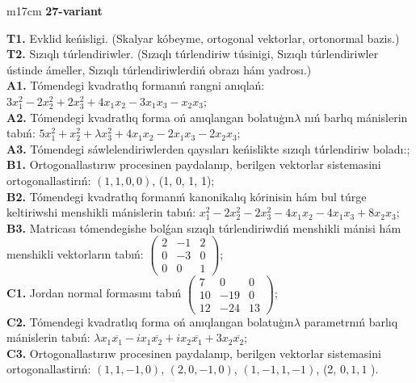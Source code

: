 \documentclass{article}
\begin{document}
\begin{tabular}{m{17cm}}
\textbf{27-variant}
\newline

\textbf{T1.} Evklid keńisligi. (Skalyar kóbeyme, ortogonal vektorlar, ortonormal bazis.) \\
\textbf{T2.} Sızıqlı túrlendiriwler.  (Sızıqlı túrlendiriw túsinigi, Sızıqlı túrlendiriwler ústinde ámeller, Sızıqlı túrlendiriwlerdiń obrazı hám yadrosı.) \\
\textbf{A1.} Tómendegi kvadratlıq formanıń rangni anıqlań: \(3x_{1}^{2} - 2x_{2}^{2} + 2x_{3}^{2} + 4x_{1}x_{2} - 3x_{1}x_{3} - x_{2}x_{3}\); \\
\textbf{A2.} Tómendegi kvadratlıq forma oń anıqlangan bolatuģın\(\lambda\) nıń barlıq mánislerin tabıń: \(5x_{1}^{2} + x_{2}^{2} + \lambda x_{3}^{2} + 4x_{1}x_{2} - 2x_{1}x_{3} - 2x_{2}x_{3}\); \\
\textbf{A3.} Tómendegi sáwlelendiriwlerden qaysıları keńislikte sızıqlı túrlendiriw boladı:; \\
\textbf{B1.} Ortogonallastırıw procesinen paydalanıp, berilgen vektorlar sistemasini ortogonallastirıń: \((1,1,0,0)\), (1, 0, 1, 1); \\
\textbf{B2.} Tómendegi kvadratlıq formanıń kanonikalıq kórinisin hám bul túrge keltiriwshi menshikli mánislerin tabıń: \(x_{1}^{2} - 2x_{2}^{2} - 2x_{3}^{2} - 4x_{1}x_{2} - 4x_{1}x_{3} + 8x_{2}x_{3}\); \\
\textbf{B3.} Matricası tómendegishe bolǵan sızıqlı túrlendiriwdiń menshikli mánisi hám menshikli vektorların tabıń: \(\begin{pmatrix} 2 & - 1 & 2 \\ 0 & - 3 & 0 \\ 0 & 0 & 1 \end{pmatrix}\); \\
\textbf{C1.} Jordan normal formasını tabıń \(\begin{pmatrix} 7 & 0 & 0 \\ 10 & - 19 & 0 \\ 12 & - 24 & 13 \end{pmatrix}\); \\
\textbf{C2.} Tómendegi kvadratlıq forma oń anıqlangan bolatuģın\(\lambda\) parametrnıń barlıq mánislerin tabıń: \(\lambda x_{1}\overline{x_{1}} - ix_{1}\overline{x_{2}} + ix_{2}\overline{x_{1}} + 3x_{2}\overline{x_{2}}\); \\
\textbf{C3.} Ortogonallastırıw procesinen paydalanıp, berilgen vektorlar sistemasini ortogonallastirıń: \((1,1, - 1,0)\), \((2,0, - 1,0)\), \((1, - 1,1, - 1)\), (2, \(0,1,1\) ). \\

\end{tabular}
\vspace{1cm}
\end{document}
